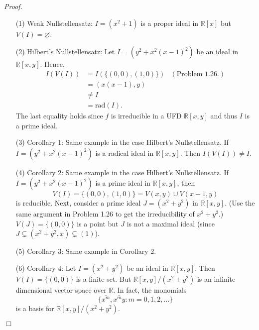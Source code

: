 \documentclass{article}
\begin{document}
\emph{Proof.}
\begin{enumerate}
\item[(1)]
  Weak Nullstellensatz:
  $I = (x^2+1)$ is a proper ideal in $\mathbb{R}[x]$ but $V(I) = \varnothing$.

\item[(2)]
  Hilbert's Nullstellensatz:
  Let $I = (y^2 + x^2(x-1)^2)$ be an ideal in $\mathbb{R}[x,y]$.
  Hence,
  \begin{align*}
    I(V(I))
    &= I(\{ (0,0), (1,0) \})
      &(\text{Problem 1.26.}) \\
    &= (x(x-1),y) \\
    &\neq I \\
    &= \mathrm{rad}(I).
  \end{align*}
  The last equality holds since $f$ is irreducible in a UFD $\mathbb{R}[x,y]$
  and thus $I$ is a prime ideal.

\item[(3)]
  Corollary 1: Same example in the case Hilbert's Nullstellensatz.
  If $I = (y^2 + x^2(x-1)^2)$ is a radical ideal in $\mathbb{R}[x,y]$.
  Then $I(V(I)) \neq I$.

\item[(4)]
  Corollary 2: Same example in the case Hilbert's Nullstellensatz.
  If $I = (y^2 + x^2(x-1)^2)$ is a prime ideal in $\mathbb{R}[x,y]$,
  then
  \[
    V(I) = \{ (0,0), (1,0) \} = V(x,y) \cup V(x-1,y)
  \]
  is reducible.
  Next, consider a prime ideal $J = (x^2+y^2)$ in $\mathbb{R}[x,y]$.
  (Use the same argument in Problem 1.26 to get the irreducibility of $x^2+y^2$.)
  $V(J) = \{ (0,0) \}$ is a point but $J$ is not a maximal ideal
  (since $J \subsetneq (x^2+y^2,x) \subsetneq (1)$).

\item[(5)]
  Corollary 3: Same example in Corollary 2.

\item[(6)]
  Corollary 4:
  Let $I = (x^2 + y^2)$ be an ideal in $\mathbb{R}[x,y]$.
  Then $V(I) = \{ (0,0) \}$ is a finite set.
  But $\mathbb{R}[x,y]/(x^2 + y^2)$ is an infinite dimensional vector space over $\mathbb{R}$.
  In fact, the monomials
  \[
    \{ \overline{x^m}, \overline{x^m y} : m = 0, 1, 2, \ldots \}
  \]
  is a basis for $\mathbb{R}[x,y]/(x^2 + y^2)$.
\end{enumerate}
$\Box$ \\\\



\end{document}
